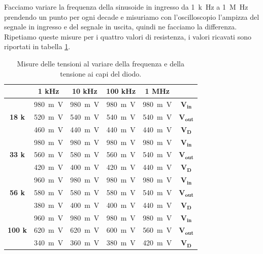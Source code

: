 \documentclass{report}
\begin{document}
Facciamo variare la frequenza della sinusoide in ingresso da \SI{1}{k\hertz} a \SI{1}{M\hertz} prendendo un punto per ogni decade e misuriamo con l'oscilloscopio l'ampizza del segnale in ingresso e del segnale in uscita, quindi ne facciamo la differenza. Ripetiamo queste misure per i quattro valori di resistenza, i valori ricavati sono riportati in tabella \ref{table:misTensioni1}.
\begin{table}[h!]
	\centering
	\begin{tabular}{|c|c|c|c|c|c|}
		\cline{2-5} 
		\multicolumn{1}{c|}{} & \textbf{1 kHz} &  \textbf{10 kHz}  &  \textbf{100 kHz}  &  \textbf{1 MHz}  &\multicolumn{1}{c}{} \\ 
		\hline
		\multirow{3}{*}{\textbf{18 k\textOmega}} & \SI{980}{m\volt} & \SI{980}{m\volt} & \SI{980}{m\volt} & \SI{980}{m\volt} & $\mathbf{V_{in}}$ \\
		\cline{2-6}
		& \SI{520}{m\volt} & \SI{540}{m\volt} & \SI{540}{m\volt} & \SI{540}{m\volt} & $\mathbf{V_{out}}$\\
		\cline{2-6}
		& \SI{460}{m\volt} & \SI{440}{m\volt} & \SI{440}{m\volt} & \SI{440}{m\volt} & $\mathbf{V_D}$\\
		\hline
		\multirow{3}{*}{\textbf{33 k\textOmega}} & \SI{980}{m\volt} & \SI{980}{m\volt} & \SI{980}{m\volt} & \SI{980}{m\volt} & $\mathbf{V_{in}}$ \\
		\cline{2-6}
		& \SI{560}{m\volt} & \SI{580}{m\volt} & \SI{560}{m\volt} & \SI{540}{m\volt} & $\mathbf{V_{out}}$\\
		\cline{2-6}
		& \SI{420}{m\volt} & \SI{400}{m\volt} & \SI{420}{m\volt} & \SI{440}{m\volt} & $\mathbf{V_D}$\\
		\hline
		\multirow{3}{*}{\textbf{56 k\textOmega}} & \SI{960}{m\volt} & \SI{980}{m\volt} & \SI{980}{m\volt} & \SI{980}{m\volt} & $\mathbf{V_{in}}$ \\
		\cline{2-6}
		& \SI{580}{m\volt} & \SI{580}{m\volt} & \SI{580}{m\volt} & \SI{540}{m\volt} & $\mathbf{V_{out}}$\\
		\cline{2-6}
		& \SI{380}{m\volt} & \SI{400}{m\volt} & \SI{400}{m\volt} & \SI{440}{m\volt} & $\mathbf{V_D}$\\
		\hline
		\multirow{3}{*}{\textbf{100 k\textOmega}} & \SI{960}{m\volt} & \SI{980}{m\volt} & \SI{980}{m\volt} & \SI{980}{m\volt} & $\mathbf{V_{in}}$ \\
		\cline{2-6}
		& \SI{620}{m\volt} & \SI{620}{m\volt} & \SI{600}{m\volt} & \SI{560}{m\volt} & $\mathbf{V_{out}}$\\
		\cline{2-6}
		& \SI{340}{m\volt} & \SI{360}{m\volt} & \SI{380}{m\volt} & \SI{420}{m\volt} & $\mathbf{V_D}$\\
		\hline
	\end{tabular}
	\caption{Misure delle tensioni al variare della frequenza e della tensione ai capi del diodo.}
	\label{table:misTensioni1}
\end{table}
\end{document}
